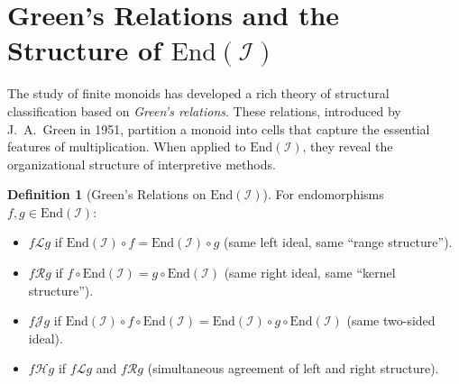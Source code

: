 \documentclass[11pt,openany]{book}
\theoremstyle{definition}
\newtheorem{definition}[axiom]{Definition}
\theoremstyle{plain}
\theoremstyle{remark}
\newcommand{\IS}{\mathcal{I}}               %
\begin{document}
\section{Green's Relations and the Structure of $\mathrm{End}(\IS)$}

The study of finite monoids has developed a rich theory of structural classification based on \emph{Green's relations}. These relations, introduced by J.\ A.\ Green in 1951, partition a monoid into cells that capture the essential features of multiplication. When applied to $\mathrm{End}(\IS)$, they reveal the organizational structure of interpretive methods.

\begin{definition}[Green's Relations on $\mathrm{End}(\IS)$]
For endomorphisms $f, g \in \mathrm{End}(\IS)$:
\begin{itemize}
\item $f \mathrel{\mathcal{L}} g$ if $\mathrm{End}(\IS) \circ f = \mathrm{End}(\IS) \circ g$ (same left ideal, same ``range structure'').
\item $f \mathrel{\mathcal{R}} g$ if $f \circ \mathrm{End}(\IS) = g \circ \mathrm{End}(\IS)$ (same right ideal, same ``kernel structure'').
\item $f \mathrel{\mathcal{J}} g$ if $\mathrm{End}(\IS) \circ f \circ \mathrm{End}(\IS) = \mathrm{End}(\IS) \circ g \circ \mathrm{End}(\IS)$ (same two-sided ideal).
\item $f \mathrel{\mathcal{H}} g$ if $f \mathrel{\mathcal{L}} g$ and $f \mathrel{\mathcal{R}} g$ (simultaneous agreement of left and right structure).
\end{itemize}
\end{definition}
\end{document}

